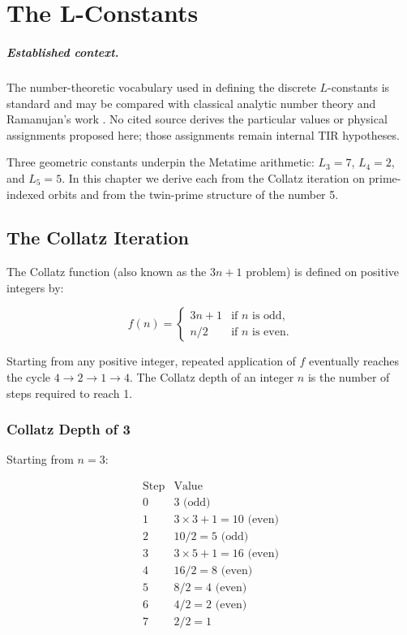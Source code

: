 \chapter{The L-Constants}
\label{ch:l_constants}


\paragraph{Established context.}
The number-theoretic vocabulary used in defining the discrete $L$-constants is
standard and may be compared with classical analytic number theory and
Ramanujan's work \cite{Apostol1976,HardyWright2008,Ramanujan1918,HardyRamanujan1918}.
No cited source derives the particular values or physical assignments proposed
here; those assignments remain internal TIR hypotheses.

Three geometric constants underpin the Metatime arithmetic:
\(L_3 = 7\), \(L_4 = 2\), and \(L_5 = 5\).  In this chapter we derive
each from the Collatz iteration on prime-indexed orbits and from the
twin-prime structure of the number 5.

\section{The Collatz Iteration}

The Collatz function (also known as the \(3n+1\) problem) is defined on
positive integers by:

\begin{equation}
f(n) = \begin{cases}
3n + 1 & \text{if } n \text{ is odd}, \\
n/2   & \text{if } n \text{ is even}.
\end{cases}
\label{eq:collatz}
\end{equation}

Starting from any positive integer, repeated application of \(f\) eventually
reaches the cycle \(4 \to 2 \to 1 \to 4\).  The Collatz depth of an integer
\(n\) is the number of steps required to reach 1.

\subsection{Collatz Depth of 3}

Starting from \(n = 3\):

\[
\begin{array}{c|c}
\text{Step} & \text{Value} \\ \hline
0 & 3 \text{ (odd)} \\
1 & 3\times 3 + 1 = 10 \text{ (even)} \\
2 & 10/2 = 5 \text{ (odd)} \\
3 & 3\times 5 + 1 = 16 \text{ (even)} \\
4 & 16/2 = 8 \text{ (even)} \\
5 & 8/2 = 4 \text{ (even)} \\
6 & 4/2 = 2 \text{ (even)} \\
7 & 2/2 = 1
\end{array}
\]

